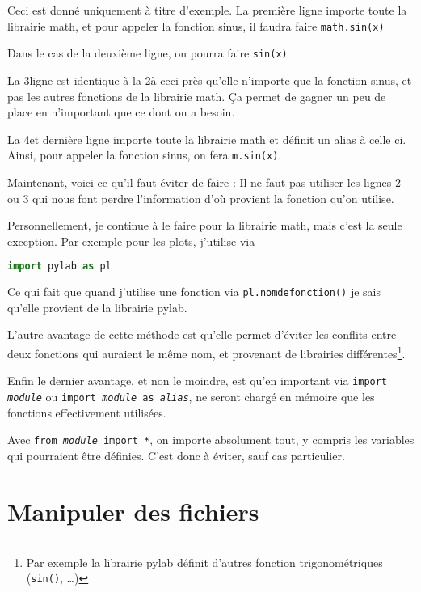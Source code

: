 \documentclass[a4paper,twoside]{article}
\begin{document}
Ceci est donné uniquement à titre d'exemple. La première ligne importe toute la librairie math, et pour appeler la fonction sinus, il faudra faire \texttt{math.sin(x)}

Dans le cas de la deuxième ligne, on pourra faire  \texttt{sin(x)}

La 3\ieme ligne est identique à la 2\ieme à ceci près qu'elle n'importe que la fonction sinus, et pas les autres fonctions de la librairie math. Ça permet de gagner un peu de place en n'important que ce dont on a besoin.

La 4\ieme et dernière ligne importe toute la librairie math et définit un alias à celle ci. Ainsi, pour appeler la fonction sinus, on fera \texttt{m.sin(x)}.

\bigskip

Maintenant, voici ce qu'il faut éviter de faire : Il ne faut pas utiliser les lignes 2 ou 3 qui nous font perdre l'information d'où provient la fonction qu'on utilise.

Personnellement, je continue à le faire pour la librairie math, mais c'est la seule exception. Par exemple pour les plots, j'utilise  via
\begin{lstlisting}[language=python]
import pylab as pl
\end{lstlisting}
Ce qui fait que quand j'utilise une fonction via \texttt{pl.nomdefonction()} je sais qu'elle provient de la librairie pylab.

L'autre avantage de cette méthode est qu'elle permet d'éviter les conflits entre deux fonctions qui auraient le même nom, et provenant de librairies différentes\footnote{Par exemple la librairie pylab définit d'autres fonction trigonométriques (\texttt{sin()}, \dots)}.

Enfin le dernier avantage, et non le moindre, est qu'en important via \texttt{import \emph{module}} ou \texttt{import \emph{module} as \emph{alias}}, ne seront chargé en mémoire que les fonctions effectivement utilisées.

\begin{attention}
Avec \texttt{from \emph{module} import *}, on importe absolument tout, y compris les variables qui pourraient être définies. C'est donc à éviter, sauf cas particulier.
\end{attention}





\section{Manipuler des fichiers}
\end{document}
